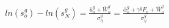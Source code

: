 \documentclass[11pt]{article}
\begin{document}
\begin{align*}
     ln(s^g_o) - ln(s^g_N) = \frac{\bar{u}^{g}_o + \bar{W}^g_o}{ \sigma^g_{\eta} } = \frac{\bar{\alpha}^{g}_o + \gamma^g F_o  + \bar{W}^g_o}{ \sigma^g_{\eta} } 
\end{align*}

\end{document}
